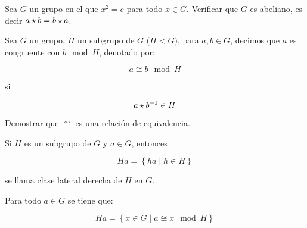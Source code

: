         \begin{ejercicio}
            Sea $G$ un grupo en el que $x^2 = e$ para todo $x \in G$. Verificar que $G$ es abeliano, es decir $a \star b = b \star a$.
        \end{ejercicio}

        \begin{definicion}
            Sea $G$ un grupo, $H$ un subgrupo de $G$ ($H < G$), para $a, b \in G$, decimos que $a$ es congruente con $b \mod H$, denotado por:

            \begin{equation}
                a \cong b \mod H
            \end{equation}

            si

            \begin{equation}
                a \star b^{-1} \in H
            \end{equation}
        \end{definicion}


        \begin{ejercicio}
            Demostrar que $\cong$ es una relación de equivalencia.
        \end{ejercicio}

        \begin{definicion}
            Si $H$ es un subgrupo de $G$ y $a \in G$, entonces

            \begin{equation}
                Ha = \left\{ ha \mid h \in H \right\}
            \end{equation}

            se llama clase lateral derecha de $H$ en $G$.
        \end{definicion}

        \begin{lema}
            Para todo $a \in G$ se tiene que:

            \begin{equation}
                Ha = \left\{ x \in G \mid a \cong x \mod H \right\}
            \end{equation}
        \end{lema}


